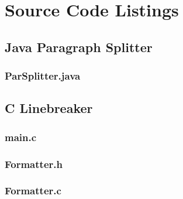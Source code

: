\chapter{Source Code Listings}


\section{Java Paragraph Splitter}
\label{app:parsplitter}
\subsection{ParSplitter.java}


\newpage

\section{C Linebreaker}
\label{app:linebreaker}
\subsection{main.c}


\newpage

\subsection{Formatter.h}


\newpage

\subsection{Formatter.c}


